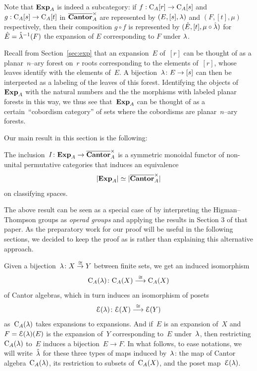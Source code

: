 Note that $\mathbf{Exp}_A$ is indeed a subcategory: if $f:\mathrm{C}_A[r]\to \mathrm{C}_A[s]$ and $g:\mathrm{C}_A[s]\to \mathrm{C}_A[t]$ in $\overline{\mathbf{Cantor}}_A^\times$  are represented by $(E,[s],\lambda)$ and $(F,[t],\mu)$ respectively, then their composition $g\circ f$ is represented by $(\hat E,[t],\mu\circ\hat{\lambda})$ for~\hbox{$\hat E=\hat{\lambda}^{-1}(F)$} the expansion of $E$ corresponding to $F$ under $\lambda$. 



\begin{rem}
Recall from Section~\ref{sec:exp} that an expansion~$E$ of~$[r]$ can be thought of as a planar~$n$--ary forest on~$r$ roots corresponding to the elements of~$[r]$, whose leaves identify with the elements of~$E$. A bijection~\hbox{$\lambda\colon E\to[s]$} can then be interpreted as a labeling of the leaves of this forest. 
Identifying the objects of~$\mathbf{Exp}_A$ with the natural numbers and the the morphisms with labeled planar forests in this way, we thus see that~$\mathbf{Exp}_A$ can be thought of as a certain~``cobordism category'' of sets where the cobordisms are planar~$n$--ary forests. 
\end{rem}


Our main result in this section is the following: 

\begin{proposition}\label{prop:expcan}
The inclusion~$I\colon\mathbf{Exp}_A\to\overline{\mathbf{Cantor}}_A^\times$ is a symmetric monoidal
functor of non-unital permutative categories that induces an equivalence
\[
|\mathbf{Exp}_A|\simeq|\overline{\mathbf{Cantor}}_A^\times|
\]
on classifying spaces. 
\end{proposition}

\begin{rem}
The above result can be seen as a special case of  \cite[Prop 2.13]{Thumann} by interpreting the Higman--Thompson groups as {\em operad groups} and applying the results in Section 3 of that paper. 
As the preparatory work for our proof will be useful in the following sections, we decided to keep the proof as is rather than explaining this alternative approach. 
\end{rem}

\begin{notation}\label{not:hatla}
Given a bijection~$\lambda\colon X\stackrel{\cong}\to Y$ between finite sets, we get an induced isomorphism  
$$\mathrm{C}_A(\lambda)\colon\mathrm{C}_A(X)\stackrel{\cong}{\longrightarrow} \mathrm{C}_A(X)$$ of Cantor algebras, which in turn induces an isomorphism of posets 
$$\mathcal{E}(\lambda)\colon\mathcal{E}(X)\stackrel{\cong}{\longrightarrow} \mathcal{E}(Y)$$ as~$\mathrm{C}_A(\lambda)$ takes expansions to expansions. And if~$E$ is an expansion of~$X$ and~$F=\mathcal{E}(\lambda)(E)$ is the expansion of~$Y$ corresponding to~$E$ under~$\lambda$,  then restricting 
$\mathrm{C}_A(\lambda)$ to~$E$ induces a bijection~$E\to F$. In what follows, to ease notations, we will write~$\hat {\lambda}$ for these three types of maps induced by~$\lambda$: the map of Cantor algebra~$\mathrm{C}_A(\lambda)$, its restriction to subsets of~$\mathrm{C}_A(X)$, and the poset map~$\mathcal{E}(\lambda)$. 
\end{notation} 



